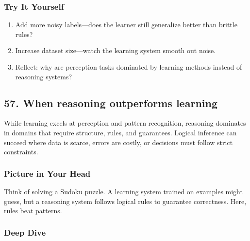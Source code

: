 \documentclass[
  letterpaper,
  DIV=11,
  numbers=noendperiod]{scrreprt}
\providecommand{\tightlist}{%
  \setlength{\itemsep}{0pt}\setlength{\parskip}{0pt}}
\begin{document}
\subsubsection{Try It Yourself}\label{try-it-yourself-55}

\begin{enumerate}
\def\labelenumi{\arabic{enumi}.}
\tightlist
\item
  Add more noisy labels---does the learner still generalize better than
  brittle rules?
\item
  Increase dataset size---watch the learning system smooth out noise.
\item
  Reflect: why are perception tasks dominated by learning methods
  instead of reasoning systems?
\end{enumerate}

\subsection{57. When reasoning outperforms
learning}\label{when-reasoning-outperforms-learning}

While learning excels at perception and pattern recognition, reasoning
dominates in domains that require structure, rules, and guarantees.
Logical inference can succeed where data is scarce, errors are costly,
or decisions must follow strict constraints.

\subsubsection{Picture in Your Head}\label{picture-in-your-head-56}

Think of solving a Sudoku puzzle. A learning system trained on examples
might guess, but a reasoning system follows logical rules to guarantee
correctness. Here, rules beat patterns.

\subsubsection{Deep Dive}\label{deep-dive-56}
\end{document}
